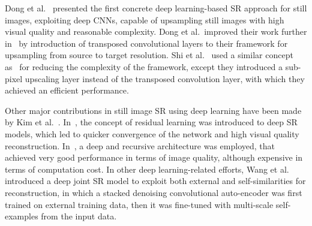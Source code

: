 \documentclass[10pt,twocolumn,letterpaper]{article}
\begin{document}
Dong et al.~\cite{dong2014,dong2016a} presented the first
concrete deep learning-based SR approach for still images, exploiting deep CNNs, capable 
of upsampling still images with high visual quality and reasonable complexity. 
Dong et al.~improved their work further in~\cite{dong2016b} 
by introduction of transposed convolutional layers to their framework for upsampling 
from source to target resolution.
Shi et al.~\cite{shi2016} used a similar concept as~\cite{dong2016b} for reducing the 
complexity of the framework, except they introduced a sub-pixel upscaling 
layer instead of the transposed convolution layer, with which 
they achieved an efficient performance.

Other major contributions in still image SR using deep learning have 
been made by Kim et al.~\cite{kim2016a,kim2016b}. In~\cite{kim2016a}, the concept of 
residual learning was introduced to deep SR models, which 
led to quicker convergence of the network and high visual quality reconstruction. 
In~\cite{kim2016b}, a deep and recursive architecture was employed, that achieved
very good performance in terms of image quality, although expensive in terms of computation 
cost. In other deep learning-related efforts, Wang et al.~\cite{wang2015} introduced a deep joint SR model to 
exploit both external and self-similarities for reconstruction, in which a stacked denoising 
convolutional auto-encoder was first trained on external training data, then it was
fine-tuned with multi-scale self-examples from the input data.
\end{document}
